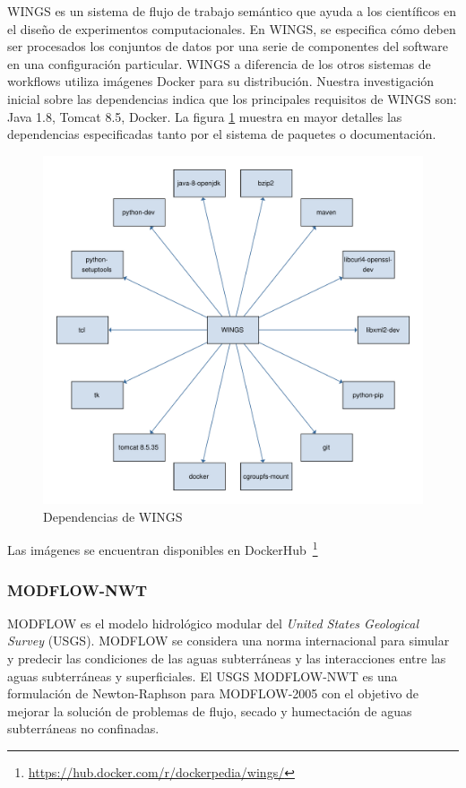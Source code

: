 WINGS es un sistema de flujo de trabajo semántico que ayuda a los científicos en el diseño de experimentos computacionales. 
En WINGS, se especifica cómo deben ser procesados los conjuntos de datos por una serie de componentes del software en una configuración particular.
WINGS a diferencia de los otros sistemas de workflows utiliza imágenes Docker para su distribución.
Nuestra investigación inicial sobre las dependencias indica que los principales requisitos de WINGS son: Java 1.8, Tomcat 8.5, Docker. La figura \ref{fig:wings-deps} muestra en mayor detalles las dependencias especificadas tanto por el sistema de paquetes o documentación.

\begin{figure}[t]
\centering
\includegraphics[width=.8\textwidth]{Figures/wings-deps}
\caption{Dependencias de WINGS}\label{fig:wings-deps}
\end{figure}

Las imágenes se encuentran disponibles en DockerHub~\footnote{\url{https://hub.docker.com/r/dockerpedia/wings/}}


\subsubsection{MODFLOW-NWT}

MODFLOW es el modelo hidrológico modular del \textit{United States Geological Survey} (USGS). MODFLOW se considera una norma internacional para simular y predecir las condiciones de las aguas subterráneas y las interacciones entre las aguas subterráneas y superficiales.
El USGS MODFLOW-NWT es una formulación de Newton-Raphson para MODFLOW-2005 con el objetivo de mejorar la solución de problemas de flujo, secado y humectación de aguas subterráneas no confinadas.

